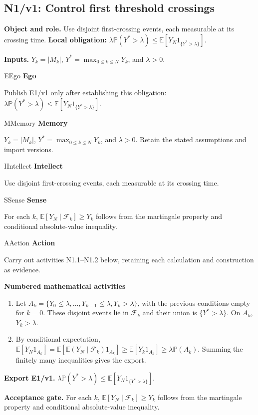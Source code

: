 \documentclass[preprint,12pt,aps,pra,showkeys,amsmath,amssymb,superscriptaddress,floatfix]{revtex4-2}
\theoremstyle{definition}
\theoremstyle{remark}
\newcommand{\mmfaculty}[3]{%
 \begin{mmfacultybox}{#1}{#2}
 {\sffamily\bfseries\color{MMBlue}#2}\par\smallskip #3
 \end{mmfacultybox}}
\newcommand{\field}[2]{\par\smallskip\noindent\textbf{#1.} #2\par}
\begin{document}
\subsection{N1/v1: Control first threshold crossings}

\field{Object and role}{Use disjoint first-crossing events, each measurable at its crossing
time. \textbf{Local obligation:}
\(\lambda\mathbb P(Y^*>\lambda)\le\mathbb E[Y_N1_{\{Y^*>\lambda\}}]\).}

\field{Inputs}{\(Y_k=|M_k|\), \(Y^*=\max_{0\le k\le N}Y_k\), and \(\lambda>0\).}

\mmfaculty{E}{Ego}{Publish E1/v1 only after establishing this obligation:
\(\lambda\mathbb P(Y^*>\lambda)\le\mathbb E[Y_N1_{\{Y^*>\lambda\}}]\).}

\mmfaculty{M}{Memory}{\(Y_k=|M_k|\), \(Y^*=\max_{0\le k\le N}Y_k\), and \(\lambda>0\). Retain
the stated assumptions and import versions.}

\mmfaculty{I}{Intellect}{Use disjoint first-crossing events, each measurable at its crossing
time.}

\mmfaculty{S}{Sense}{For each \(k\), \(\mathbb E[Y_N\mid\mathcal F_k]\ge Y_k\) follows from
the martingale property and conditional absolute-value inequality.}

\mmfaculty{A}{Action}{Carry out activities N1.1--N1.2 below, retaining each calculation and
construction as evidence.}

\smallskip\noindent\textbf{Numbered mathematical activities}

\begin{enumerate}[label=N1.\arabic*,leftmargin=3.4em]

\item Let \(A_k=\{Y_0\le\lambda,\ldots,Y_{k-1}\le\lambda,Y_k>\lambda\}\), with
the previous conditions empty for \(k=0\). These disjoint events lie in
\(\mathcal F_k\) and their union is \(\{Y^*>\lambda\}\). On \(A_k\),
\(Y_k>\lambda\).

\item By conditional expectation,
\(\mathbb E[Y_N1_{A_k}]=\mathbb E[\mathbb E(Y_N\mid\mathcal F_k)1_{A_k}]\ge\mathbb E[Y_k1_{A_k}]\ge\lambda\mathbb P(A_k)\).
Summing the finitely many inequalities gives the export.

\end{enumerate}

\field{Export E1/v1}{\(\lambda\mathbb P(Y^*>\lambda)\le\mathbb E[Y_N1_{\{Y^*>\lambda\}}]\).}

\field{Acceptance gate}{For each \(k\), \(\mathbb E[Y_N\mid\mathcal F_k]\ge Y_k\) follows from
the martingale property and conditional absolute-value inequality.}
\end{document}
